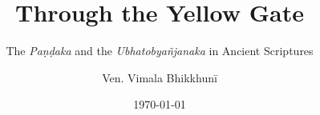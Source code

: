 \clearpage
\thispagestyle{empty}
\titlehead{}
\title{Through the Yellow Gate}
\subtitle{The {\em Paṇḍaka} and the {\em Ubhatob­yañ­janaka} in Ancient Scriptures}
\author{Ven. Vimala Bhikkhunī}
\date{\today}
\maketitle
